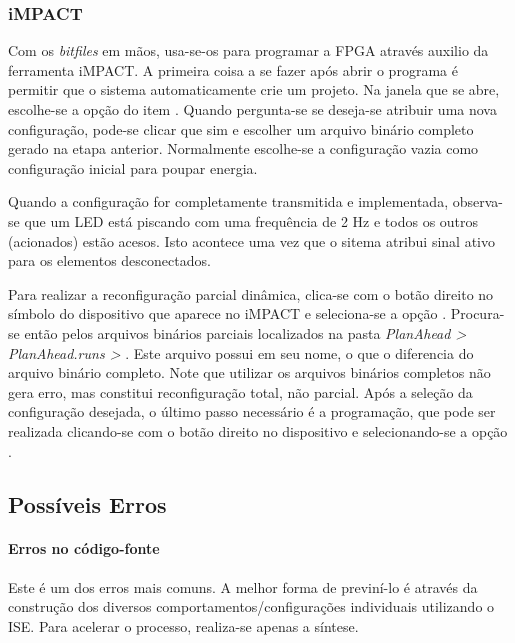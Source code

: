 \documentclass[11pt,a4paper,oneside]{book}
\begin{document}
\subsubsection{iMPACT}
Com os \textit{bitfiles} em mãos, usa-se-os para programar a FPGA através auxilio da ferramenta iMPACT. 
A primeira coisa a se fazer após abrir o programa é permitir que o sistema automaticamente crie um projeto.
Na janela que se abre, escolhe-se a opção  do item .
Quando pergunta-se se deseja-se atribuir uma nova configuração, pode-se clicar que sim e escolher um arquivo binário completo gerado na etapa anterior.
Normalmente escolhe-se a configuração vazia como configuração inicial para poupar energia.

Quando a configuração for completamente transmitida e implementada, observa-se que um LED está piscando com uma frequência de 2 Hz e todos os outros (acionados) estão acesos.
Isto acontece uma vez que o sitema atribui sinal ativo para os elementos desconectados.

Para realizar a reconfiguração parcial dinâmica, clica-se com o botão direito no símbolo do dispositivo que aparece no iMPACT e seleciona-se a opção .
Procura-se então pelos arquivos binários parciais localizados na pasta \textit{PlanAhead > PlanAhead.runs >} .
Este arquivo possui  em seu nome, o que o diferencia do arquivo binário completo.
Note que utilizar os arquivos binários completos não gera erro, mas constitui reconfiguração total, não parcial.
Após a seleção da configuração desejada, o último passo necessário é a programação, que pode ser realizada clicando-se com o botão direito no dispositivo e selecionando-se a opção .

\subsection{Possíveis Erros}
\paragraph{Erros no código-fonte} Este é um dos erros mais comuns.
A melhor forma de previní-lo é através da construção dos diversos comportamentos/configurações individuais utilizando o ISE.
Para acelerar o processo, realiza-se apenas a síntese.
\end{document}
